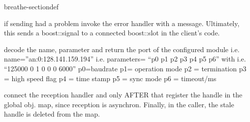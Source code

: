 \documentclass[a4paper,10pt,english]{sphinxmanual}
\begin{document}
\begin{fulllineitems}
\begin{sphinxuseclass}{breathe-sectiondef}
\begin{fulllineitems}
\sphinxAtStartPar
{} 

\end{fulllineitems}



\begin{fulllineitems}
%
\pysigstartmultiline
{}%
\pysigstopmultiline
\sphinxAtStartPar
if sending had a problem invoke the error handler with a message. Ultimately, this sends a boost::signal to a connected boost::slot in the client’s code. 

\end{fulllineitems}



\begin{fulllineitems}
%
\pysigstartmultiline
{}%
\pysigstopmultiline
\sphinxAtStartPar
decode the name, parameter and return the port of the configured module i.e. name=”an:0:128.141.159.194” i.e. parameters= “p0 p1 p2 p3 p4 p5 p6” with i.e. “125000 0 1 0 0 0 6000” p0=baudrate p1= operation mode p2 = termination p3 = high speed flag p4 = time stamp p5 = sync mode p6 = timeout/ms 

\end{fulllineitems}



\begin{fulllineitems}
%
\pysigstartmultiline
{}%
\pysigstopmultiline
\sphinxAtStartPar
connect the reception handler and only AFTER that register the handle in the global obj. map, since reception is asynchron. Finally, in the caller, the stale handle is deleted from the map. 

\end{fulllineitems}



\begin{fulllineitems}
%
\pysigstartmultiline
{}%
\pysigstopmultiline
\sphinxAtStartPar


\end{fulllineitems}
\end{sphinxuseclass}
\end{fulllineitems}
\end{document}
